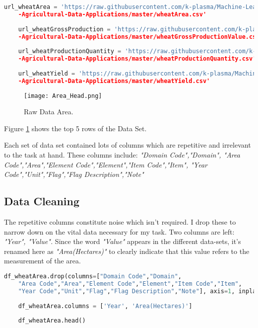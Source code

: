 \documentclass[
]{thesis-ekf}
\begin{document}
\begin{lstlisting}[language=Python]
	url_wheatArea = 'https://raw.githubusercontent.com/k-plasma/Machine-Learning-Models-for
	-Agricultural-Data-Applications/master/wheatArea.csv'	
	
	url_wheatGrossProduction = 'https://raw.githubusercontent.com/k-plasma/Machine-Learning-Models-for
	-Agricultural-Data-Applications/master/wheatGrossProductionValue.csv'	
	
	url_wheatProductionQuantity = 'https://raw.githubusercontent.com/k-plasma/Machine-Learning-Models-for
	-Agricultural-Data-Applications/master/wheatProductionQuantity.csv'	
	
	url_wheatYield = 'https://raw.githubusercontent.com/k-plasma/Machine-Learning-Models-for
	-Agricultural-Data-Applications/master/wheatYield.csv'
\end{lstlisting}

\begin{figure}[h!]
	\texttt{[image: Area\_Head.png]}
	\caption{Raw Data Area.}
	\label{fig:Areaa_Head1}
\end{figure}

Figure \ref{fig:Areaa_Head1} shows the top 5 rows of the Data Set.


Each set of data set contained lots of columns which are repetitive and irrelevant to the task at hand. These columns include: \textit{"Domain Code","Domain",
	"Area Code","Area","Element Code","Element","Item Code","Item",
	"Year Code","Unit","Flag","Flag Description","Note"}

\subsection{Data Cleaning} 
The repetitive columns constitute noise which isn't required. I drop these to narrow down on the vital data necessary for my task. Two columns are left: \textit{"Year", "Value".} Since the word \textit{"Value"} appears in the different data-sets, it's renamed here as \textit{"Area(Hectares)"} to clearly indicate that this value refers to the measurement of the area.


\begin{lstlisting}[language=Python]
	df_wheatArea.drop(columns=["Domain Code","Domain",
	"Area Code","Area","Element Code","Element","Item Code","Item",
	"Year Code","Unit","Flag","Flag Description","Note"], axis=1, inplace=True)
	
	df_wheatArea.columns = ['Year', 'Area(Hectares)'] 
	
	df_wheatArea.head()
\end{lstlisting}
\end{document}
